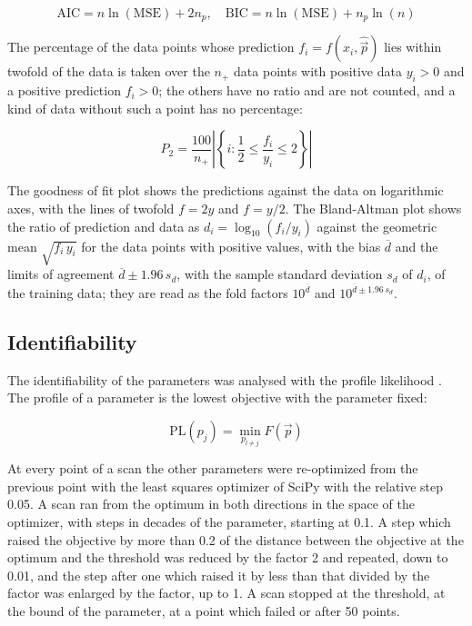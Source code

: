 \begin{equation}
\mathrm{AIC} = n \ln(\mathrm{MSE}) + 2 n_p, \quad \mathrm{BIC} = n \ln(\mathrm{MSE}) + n_p \ln(n)
\end{equation}

The percentage of the data points whose prediction $f_i = f(x_i, \hat{\vec{p}})$ lies within twofold of the data is taken over the $n_+$ data points with positive data $y_i > 0$ and a positive prediction $f_i > 0$; the others have no ratio and are not counted, and a kind of data without such a point has no percentage:

\begin{equation}
P_2 = \frac{100}{n_+} \left|\left\{ i : \frac{1}{2} \le \frac{f_i}{y_i} \le 2 \right\}\right|
\end{equation}

The goodness of fit plot shows the predictions against the data on logarithmic axes, with the lines of twofold $f = 2y$ and $f = y/2$. The Bland-Altman plot \cite{Bland1986} shows the ratio of prediction and data as $d_i = \log_{10}(f_i / y_i)$ against the geometric mean $\sqrt{f_i\, y_i}$ for the data points with positive values, with the bias $\overline{d}$ and the limits of agreement $\overline{d} \pm 1.96\, s_d$, with the sample standard deviation $s_d$ of $d_i$, of the training data; they are read as the fold factors $10^{\overline{d}}$ and $10^{\overline{d} \pm 1.96\, s_d}$.

\subsection{Identifiability}

The identifiability of the parameters was analysed with the profile likelihood \cite{Raue2009,Kreutz2013}. The profile of a parameter is the lowest objective with the parameter fixed:

\begin{equation}
\mathrm{PL}(p_j) = \min_{p_{l \neq j}} F(\vec{p})
\end{equation}

At every point of a scan the other parameters were re-optimized from the previous point with the least squares optimizer of SciPy with the relative step 0.05. A scan ran from the optimum in both directions in the space of the optimizer, with steps in decades of the parameter, starting at 0.1. A step which raised the objective by more than 0.2 of the distance between the objective at the optimum and the threshold was reduced by the factor 2 and repeated, down to 0.01, and the step after one which raised it by less than that divided by the factor was enlarged by the factor, up to 1. A scan stopped at the threshold, at the bound of the parameter, at a point which failed or after 50 points.


